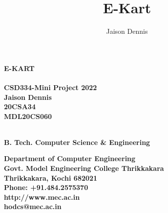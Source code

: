 \documentclass[11pt]{report}
\begin{document}
\renewcommand\bibname{References}
\pagestyle{fancy}
\fancyfoot{}
\fancyfoot[c]{\thepage}
\renewcommand{\chaptermark}[1]{
\markboth{\thechapter.\ #1}{}} 
\renewcommand{\headrulewidth}{0.1pt}
\fancyhead[r]{\slshape \leftmark}
\addtolength{\headheight}{\baselineskip}

\lhead{\nouppercase{\rightmark}}
\rhead{\nouppercase{\leftmark}}
%
\title {E-Kart}
\author {Jaison Dennis}

\begin{titlepage}
\begin{center}

\Huge{\textbf{E-KART}}\\
\large{\textbf{\\CSD334-Mini Project 2022\\}}
\vspace{1.2in}
\Large{\textbf{Jaison Dennis}}\\ 
\Large{\textbf{20CSA34\\
MDL20CS060\\
}}	\hspace{.1in}	

\Large{\textbf{
\\B. Tech. Computer Science \& Engineering
}}


\vspace{.6in}
\begin{figure}[h]
\begin{center}
\end{center}
\end{figure}
\textbf{
Department of Computer Engineering\\
Govt. Model Engineering College Thrikkakara\\
Thrikkakara, Kochi 682021\\
Phone: +91.484.2575370\\
http://www.mec.ac.in \\
hodcs@mec.ac.in
}
\end{center}
\end{titlepage}
\end{document}
